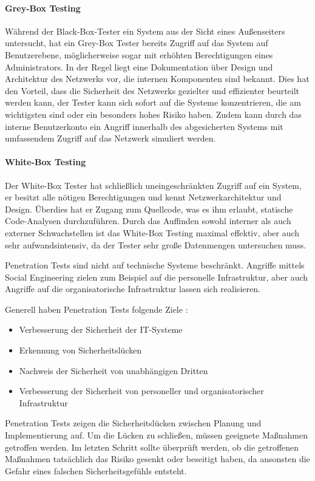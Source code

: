 \documentclass[12pt,oneside,a4paper,parskip,pointlessnumbers]{scrbook}
\begin{document}
    \paragraph{Grey-Box Testing}
    Während der Black-Box-Tester ein System aus der Sicht eines Außenseiters untersucht, hat ein    Grey-Box Tester bereits Zugriff auf das System auf Benutzerebene, möglicherweise sogar mit erhöhten Berechtigungen eines Administrators. In der Regel liegt eine Dokumentation über Design und Architektur des Netzwerks vor, die internen Komponenten sind bekannt. Dies hat den Vorteil, dass die Sicherheit des Netzwerks gezielter und effizienter beurteilt werden kann, der Tester kann sich sofort auf die Systeme konzentrieren, die am wichtigsten sind oder ein besonders hohes Risiko haben. Zudem kann durch das interne Benutzerkonto ein Angriff innerhalb des abgesicherten Systems mit umfassendem Zugriff auf das Netzwerk simuliert werden.
    \paragraph{White-Box Testing}
    Der White-Box Tester hat schließlich uneingeschränkten Zugriff auf ein System, er besitzt alle nötigen Berechtigungen und kennt Netzwerkarchitektur und Design. Überdies hat er Zugang zum Quellcode, was es ihm erlaubt, statische Code-Analysen durchzuführen. Durch das Auffinden sowohl interner als auch externer Schwachstellen ist das White-Box Testing maximal effektiv, aber auch sehr aufwandsintensiv, da der Tester sehr große Datenmengen untersuchen muss.

    Penetration Tests sind nicht auf technische Systeme beschränkt. Angriffe mittels Social Engineering zielen zum Beispiel auf die personelle Infrastruktur, aber auch Angriffe auf die organisatorische Infrastruktur lassen sich realisieren. \cite{BSI}

    Generell haben Penetration Tests folgende Ziele \cite{BSI}:
    \begin{itemize}
      \item Verbesserung der Sicherheit der IT-Systeme
      \item Erkennung von Sicherheitslücken
      \item Nachweis der Sicherheit von unabhängigen Dritten
      \item Verbesserung der Sicherheit von personeller und organisatorischer Infrastruktur
    \end{itemize}
    Penetration Tests zeigen die Sicherheitslücken zwischen Planung und Implementierung auf. Um die Lücken zu schließen, müssen geeignete Maßnahmen getroffen werden. Im letzten Schritt sollte überprüft werden, ob die getroffenen Maßnahmen tatsächlich das Risiko gesenkt oder beseitigt haben, da ansonsten die Gefahr eines falschen Sicherheitsgefühls entsteht. \cite{BSI}
    \newpage
\end{document}

